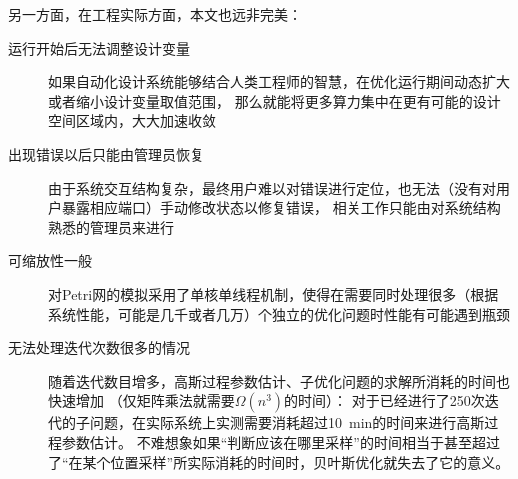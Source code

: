 \documentclass[index]{subfiles}
\begin{document}
另一方面，在工程实际方面，本文也远非完美：
\begin{description}
  \item[运行开始后无法调整设计变量] 如果自动化设计系统能够结合人类工程师的智慧，在优化运行期间动态扩大或者缩小设计变量取值范围，
  那么就能将更多算力集中在更有可能的设计空间区域内，大大加速收敛
  \item[出现错误以后只能由管理员恢复] 由于系统交互结构复杂，最终用户难以对错误进行定位，也无法（没有对用户暴露相应端口）手动修改状态以修复错误，
  相关工作只能由对系统结构熟悉的管理员来进行
  \item[可缩放性一般] 对Petri网的模拟采用了单核单线程机制，使得在需要同时处理很多（根据系统性能，可能是几千或者几万）个独立的优化问题时性能有可能遇到瓶颈
  \item[无法处理迭代次数很多的情况] 随着迭代数目增多，高斯过程参数估计、子优化问题的求解所消耗的时间也快速增加
  （仅矩阵乘法就需要$\Omega(n^3)$的时间）：
  对于已经进行了250次迭代的子问题，在实际系统上实测需要消耗超过\SI{10}{\minute}的时间来进行高斯过程参数估计。
  不难想象如果“判断应该在哪里采样”的时间相当于甚至超过了“在某个位置采样”所实际消耗的时间时，贝叶斯优化就失去了它的意义。
\end{description}
\end{document}
